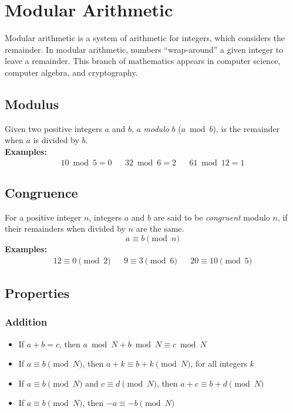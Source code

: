 \documentclass[12pt]{article}
\begin{document}
\section{Modular Arithmetic}
Modular arithmetic is a system of arithmetic for integers, which considers the remainder. In modular arithmetic, numbers ``wrap-around'' a given integer to leave a remainder. This branch of mathematics appears in computer science, computer algebra, and cryptography.

\subsection{Modulus}
Given two positive integers $a$ and $b$, $a$ \textit{modulo} $b$ ($a \bmod b$), is the remainder when $a$ is divided by $b$. \\

\textbf{Examples:}
\begin{align*}
    10 \bmod 5 = 0 && 32 \bmod 6 = 2 && 61 \bmod 12 = 1
\end{align*}

\subsection{Congruence}
For a positive integer $n$, integers $a$ and $b$ are said to be \textit{congruent} modulo $n$, if their remainders when divided by $n$ are the same. $$a \equiv b \pmod n$$
\textbf{Examples:}
\begin{align*}
    12 \equiv 0 \pmod 2 && 9 \equiv 3 \pmod 6 && 20 \equiv 10 \pmod 5
\end{align*}

\subsection{Properties}
\subsubsection{Addition}
\begin{itemize}
    \item If $a + b = c$, then $a \bmod N + b \bmod N \equiv c \bmod N$
    \item If $a \equiv b \pmod N$, then $a + k \equiv b + k \pmod N$, for all integers $k$
    \item If $a \equiv b \pmod N$ and $c \equiv d \pmod N$, then $a + c \equiv b + d \pmod N$
    \item If $a \equiv b \pmod N$, then $-a \equiv -b \pmod N$
\end{itemize}
\end{document}
